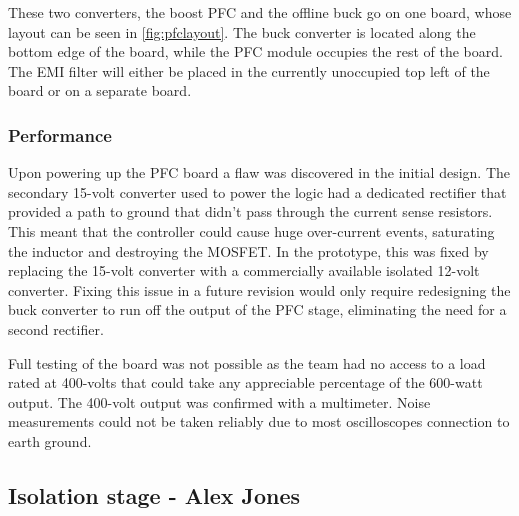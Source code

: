 \documentclass[15pt]{article}
\begin{document}
These two converters, the boost PFC and the offline buck go on one board, whose layout can be seen in \autoref{fig:pfclayout}. The buck converter is located along the bottom edge of the board, while the PFC module occupies the rest of the board. The EMI filter will either be placed in the currently unoccupied top left of the board or on a separate board. 


\subsubsection{Performance}
Upon powering up the PFC board a flaw was discovered in the initial design. The secondary 15-volt converter used to power the logic had a dedicated rectifier that provided a path to ground that didn't pass through the current sense resistors. This meant that the controller could cause huge over-current events, saturating the inductor and destroying the MOSFET. In the prototype, this was fixed by replacing the 15-volt converter with a commercially available isolated 12-volt converter. Fixing this issue in a future revision would only require redesigning the buck converter to run off the output of the PFC stage, eliminating the need for a second rectifier.

Full testing of the board was not possible as the team had no access to a load rated at 400-volts that could take any appreciable percentage of the 600-watt output. The 400-volt output was confirmed with a multimeter. Noise measurements could not be taken reliably due to most oscilloscopes connection to earth ground.

\subsection{Isolation stage  - Alex Jones}
\end{document}
